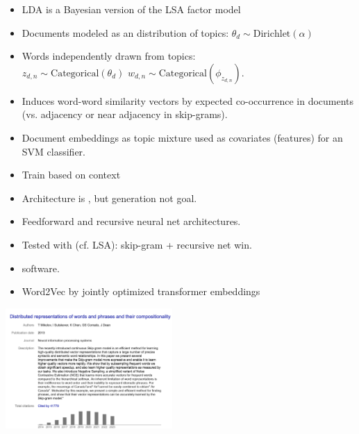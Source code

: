 \documentclass[10pt]{report}
\begin{document}
\begin{itemize}
\item LDA is a Bayesian version of the LSA factor model
\item Documents modeled as an distribution of topics: $\theta_d \sim \textrm{Dirichlet}(\alpha)$
\item Words independently drawn from topics:\\ $z_{d,n} \sim
  \textrm{Categorical}(\theta_d)$ \qquad \quad $w_{d,n} \sim \textrm{Categorical}(\phi_{z_{d,n}})$.
\item Induces word-word similarity vectors by expected co-occurrence
  in documents (vs. adjacency or near adjacency in skip-grams).
\item Document embeddings as topic mixture used as covariates
  (features) for an SVM classifier.
\end{itemize}
\vfill
{}

\begin{itemize}
\item Train  based on context
\item Architecture is , but generation not goal.
\item Feedforward and recursive neural net architectures.
\item Tested with  (cf. LSA): skip-gram +
  recursive net win.
\item {} software. 
\end{itemize}
\vfill 
{}

\begin{itemize}
\item Word2Vec  by jointly optimized transformer embeddings 
\end{itemize}
\begin{center}
\includegraphics[width=2.5in]{img/word2vec.png}
\end{center}
\end{document}

